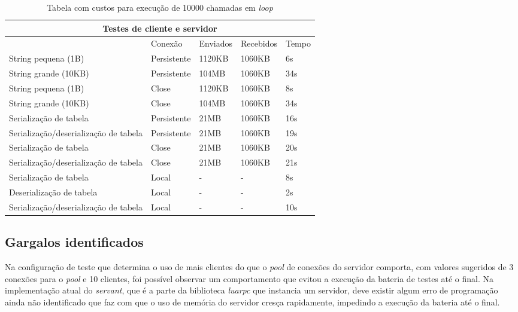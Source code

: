 \documentclass[11pt]{article}
\begin{document}
\renewcommand{\arraystretch}{2}
\begin{table}
\begin{center}
{\footnotesize \begin{tabular}{p{2.5cm} p{2.5cm} p{2.5cm} p{2.5cm} p{2.5cm}}
\hline
\multicolumn{5}{c}{Testes de cliente e servidor} \\ \hline
~ & Conexão & Enviados & Recebidos & Tempo \\ \hline
String pequena (1B) & Persistente & 1120KB & 1060KB & 6s \\
String grande (10KB) & Persistente & 104MB & 1060KB & 34s \\
String pequena (1B) & Close & 1120KB & 1060KB & 8s \\
String grande (10KB) & Close & 104MB & 1060KB & 34s \\
Serialização de tabela & Persistente & 21MB & 1060KB & 16s \\
Serialização/deserialização de tabela & Persistente & 21MB & 1060KB & 19s \\
Serialização de tabela & Close & 21MB & 1060KB & 20s \\
Serialização/deserialização de tabela & Close & 21MB & 1060KB & 21s \\
Serialização de tabela & Local & - & - & 8s \\
Deserialização de tabela & Local & - & - & 2s \\
Serialização/deserialização de tabela & Local & - & - & 10s \\
\hline
\end{tabular}}
\caption{Tabela com custos para execução de 10000 chamadas em \textit{loop}}
\label{tab:perf}
\end{center}
\end{table}

\subsection{Gargalos identificados}\label{subsec:bottle}

Na configuração de teste que determina o uso de mais clientes do que o
\textit{pool} de conexões do servidor comporta, com valores sugeridos de 3
conexões para o \textit{pool} e 10 clientes, foi possível observar um
comportamento que evitou a execução da bateria de testes até o final. Na
implementação atual do \textit{servant}, que é a parte da biblioteca
\textit{luarpc} que instancia um servidor, deve existir algum erro de
programação ainda não identificado que faz com que o uso de memória do servidor
cresça rapidamente, impedindo a execução da bateria até o final.
\end{document}

